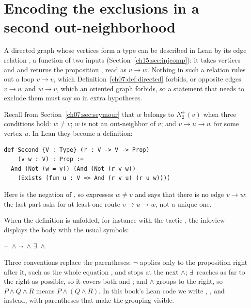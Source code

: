 \section{Encoding the exclusions in a second out-neighborhood}\label{ch16:sec:second}
A directed graph whose vertices form a type  can be described in Lean by its edge relation , a function of two inputs (Section~\ref{ch15:sec:injcomp}): it takes vertices  and  and returns the proposition , read as $v\to w$. Nothing in such a relation rules out a loop $v\to v$, which Definition~\ref{ch07:def:directed} forbids, or opposite edges $v\to w$ and $w\to v$, which an oriented graph forbids, so a statement that needs to exclude them must say so in extra hypotheses.

Recall from Section~\ref{ch07:sec:seymour} that $w$ belongs to $N_2^+(v)$ when three conditions hold: $w\ne v$; $w$ is not an out-neighbor of $v$; and $v\to u\to w$ for some vertex $u$. In Lean they become a definition:
\par\noindent\begin{minipage}{\linewidth}
\begin{lstlisting}
def Second {V : Type} (r : V -> V -> Prop)
    (v w : V) : Prop :=
  And (Not (w = v)) (And (Not (r v w))
    (Exists (fun u : V => And (r v u) (r u w))))
\end{lstlisting}
\end{minipage}\par
Here  is the negation of , so  expresses $w\ne v$ and  says that there is no edge $v\to w$; the last part asks for at least one route $v\to u\to w$, not a unique one.

When the definition is unfolded, for instance with the tactic , the infoview displays the body with the usual symbols:
\begin{center}
$\neg$\, $\land$ $\neg$\, $\land$ $\exists$\, $\land$ 
\end{center}
Three conventions replace the parentheses: $\neg$ applies only to the proposition right after it, such as the whole equation , and stops at the next $\land$; $\exists$\, reaches as far to the right as possible, so it covers both  and ; and $\land$ groups to the right, so $P\land Q\land R$ means $P\land(Q\land R)$. In this book's Lean code we write , , and  instead, with parentheses that make the grouping visible.

